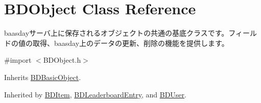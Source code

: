 \hypertarget{interface_b_d_object}{\section{B\-D\-Object Class Reference}
\label{interface_b_d_object}
}


baasdayサーバ上に保存されるオブジェクトの共通の基底クラスです。フィールドの値の取得、baasday上のデータの更新、削除の機能を提供します。  




{\ttfamily \#import $<$B\-D\-Object.\-h$>$}



Inherits \hyperlink{interface_b_d_basic_object}{B\-D\-Basic\-Object}.



Inherited by \hyperlink{interface_b_d_item}{B\-D\-Item}, \hyperlink{interface_b_d_leaderboard_entry}{B\-D\-Leaderboard\-Entry}, and \hyperlink{interface_b_d_user}{B\-D\-User}.

